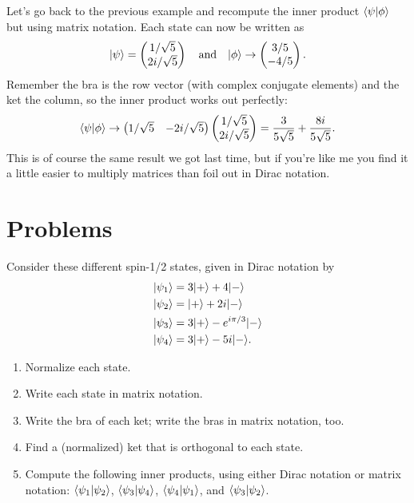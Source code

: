 \begin{example}
Let's go back to the previous example and recompute the inner product $\langle \psi | \phi \rangle$ but using matrix notation.  Each state can now be written as 
\[
| \psi \rangle = \begin{pmatrix} 1/\sqrt{5} \\ 2i/\sqrt{5} \end{pmatrix} \quad \text{and} \quad | \phi \rangle \to \begin{pmatrix} 3/5 \\ -4/5 \end{pmatrix}.
\]
Remember the bra is the row vector (with complex conjugate elements) and the ket the column, so the inner product works out perfectly:
\[
\langle \psi | \phi \rangle \to \begin{pmatrix} 1/\sqrt{5} & -2i/\sqrt{5} \end{pmatrix} \begin{pmatrix} 1/\sqrt{5} \\ 2i/\sqrt{5} \end{pmatrix} = \frac{3}{5\sqrt{5}} + \frac{8i}{5\sqrt{5}}.
\]
This is of course the same result we got last time, but if you're like me you find it a little easier to multiply matrices than foil out in Dirac notation.  

\end{example}

\section*{Problems}
%

\begin{problem}
Consider these different spin-1/2 states, given in Dirac notation by
\begin{align*}
| \psi_1 \rangle &= 3 | + \rangle + 4| - \rangle \\
| \psi_2 \rangle &= | + \rangle + 2i | - \rangle \\
| \psi_3 \rangle &= 3 | + \rangle - e^{i\pi/3}| - \rangle \\
| \psi_4 \rangle &= 3 | + \rangle - 5i| - \rangle.
\end{align*}
\begin{enumerate}[label=(\alph*)]
\item Normalize each state.
\item Write each state in matrix notation.
\item Write the bra of each ket; write the bras in matrix notation, too.
\item Find a (normalized) ket that is orthogonal to each state.
\item Compute the following inner products, using either Dirac notation or matrix notation:  $\langle \psi_1 | \psi_2 \rangle$, $\langle \psi_3 | \psi_4 \rangle$, $\langle \psi_4 | \psi_1 \rangle$, and $\langle \psi_3 | \psi_2 \rangle$.
\end{enumerate}
\end{problem}


